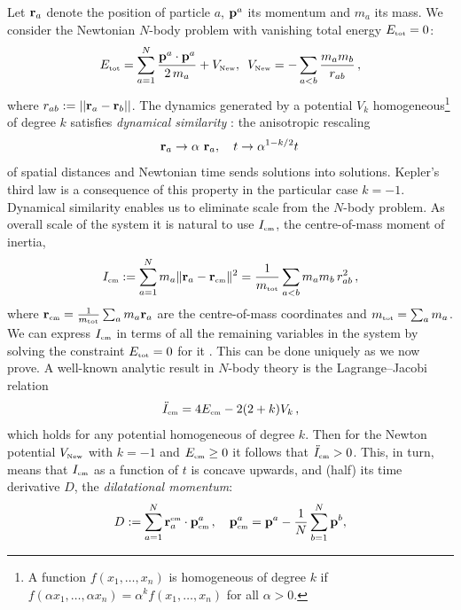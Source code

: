 \documentclass[prl,nofootinbib,twocolumn,superscriptaddress]{revtex4}
\newcommand{\st}[1]{\text{\tiny \rm #1}}
\begin{document}
Let ${\bf r}_a$ denote the position of particle $a$, ${\bf p}^a$ its momentum and $m_a$ its mass. We consider the Newtonian $N$-body problem with vanishing total energy $E_\st{tot} = 0$:
\begin{equation}
E_\st{tot} = \sum_{a =1}^N \frac{\mathbf p^a \cdot \mathbf p^a  }{2 \, m_a} +   V_\st{New} ,\,\,\,   V_\st{New} = - \sum_{a<b}{m_a m_b\over r_{ab} } \,,
\end{equation}
where $r_{ab}:=||{\bf r}_a-{\bf r}_b||$. The dynamics generated by a potential $V_k$ homogeneous\footnote{A function $f(x_1,\dots,x_n)$ is homogeneous of degree $k$ if $f(\alpha x_1,\dots,\alpha x_n) = \alpha^k f(x_1,\dots,x_n)$ for all $\alpha >0$.} of degree $k$ satisfies \emph{dynamical similarity} \cite{Landau-Lifshitz}: the anisotropic rescaling 
\begin{equation}\label{DynamicalSimilarity}
{\bf r}_a \to \alpha ~ {\bf r}_a, ~~~ t \to \alpha^{1-k/2} t \,
\end{equation}
of spatial distances and Newtonian time sends solutions into solutions. Kepler's third law is a consequence of this property
in the particular case $k = -1$. Dynamical similarity enables us to eliminate scale from the $N$-body problem. As overall scale of the system
it is natural to use $I_\st{cm}$, the centre-of-mass moment of inertia,
\begin{equation}
  I_\st{cm} :=  \sum_{a=1}^N m_a \|  {\bf r}_a - {\bf r}_\st{cm} \|^2  = {1\over m_\st{tot}}\sum_{a<b}m_a m_b \, r_{ab}^2\,, \label{Icm}
\end{equation}
where $\mathbf r_\st{cm}=  {1\over m_\st{tot}} \sum_a m_a \mathbf r_a$ are the centre-of-mass coordinates and $m_\st{tot} = \sum_a m_a$. We can express $I_\st{cm}$ in terms
of all the remaining variables in the system by solving the constraint $E_\st{tot} = 0$ for it \cite{LongPaper}. This can be done uniquely as we now prove. A well-known analytic result in $N$-body theory is the Lagrange--Jacobi relation \cite{LongPaper}
\begin{equation}
\ddot I_\st{cm}=4E_\st{cm}-2(2+k)V_k\,,\label{ljr}
\end{equation}
which holds for any potential homogeneous of degree $k$. Then for the Newton potential $V_\st{New}$ with $k=-1$ and $E_\st{cm}\ge 0$ it follows that $\ddot I_\st{cm}>0$. This, in turn, means that $I_\st{cm}$ as a function of $t$ is concave upwards, and (half) its time derivative
$D$, the \emph{dilatational momentum}:
\begin{equation}
 D:= \sum_{a=1}^N {\bf r}_a^\st{cm} \cdot {\bf p}^a_\st{cm} \,, ~~~ {\bf p}^a_\st{cm} = {\bf p}^a  - {1\over N} \sum_{b=1}^N {\bf p}^b, \label{dilmtm} 
\end{equation}
\end{document}
